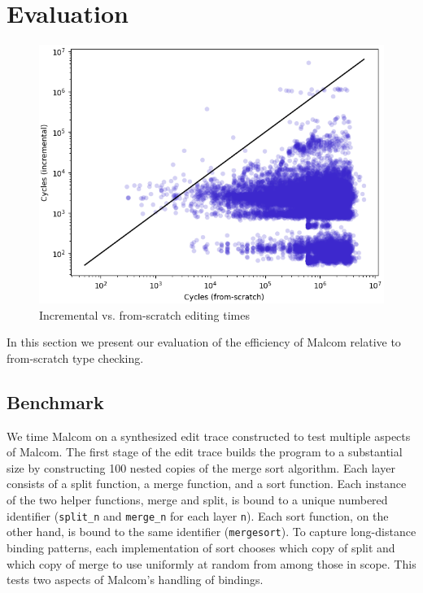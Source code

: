 
\section{Evaluation}%
\label{sec:Evaluation}

\begin{figure}
\includegraphics[width=0.75\linewidth]{images/scatter-plot.png}
\caption{Incremental vs. from-scratch editing times}
\label{fig:scatter-plot}
\end{figure}


In this section we present our evaluation of the efficiency of Malcom relative to from-scratch type checking.  

\subsection{Benchmark}
We time Malcom on a synthesized edit trace constructed to test multiple aspects of Malcom. The first stage of the edit trace builds the program to a substantial size by constructing 100 nested copies of the merge sort algorithm. Each layer consists of a split function, a merge function, and a sort function. Each instance of the two helper functions, merge and split, is bound to a unique numbered identifier (\texttt{split\_n} and \texttt{merge\_n} for each layer \texttt{n}). Each sort function, on the other hand, is bound to the same identifier (\texttt{mergesort}). To capture long-distance binding patterns, each implementation of sort chooses which copy of split and which copy of merge to use uniformly at random from among those in scope. This  tests two aspects of Malcom's handling of bindings.

